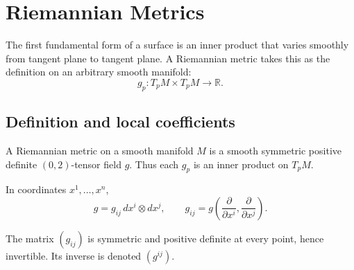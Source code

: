 \chapter{Riemannian Metrics}
\label{ch:vii20-riemannian-metrics}

The first fundamental form of a surface is an inner product that varies smoothly
from tangent plane to tangent plane.  A Riemannian metric takes this as the
definition on an arbitrary smooth manifold:
\[
\boxed{g_p:T_pM\times T_pM\to\mathbb R.}
\]

\section{Definition and local coefficients}

\begin{definition}\label{def:vii20-metric}
A Riemannian metric on a smooth manifold \(M\) is a smooth symmetric positive
definite \((0,2)\)-tensor field \(g\). Thus each \(g_p\) is an inner product on
\(T_pM\).
\end{definition}

In coordinates \(x^1,\dots,x^n\),
\[
g=g_{ij}\,dx^i\otimes dx^j,
\qquad
g_{ij}=g\!\left(\frac{\partial}{\partial x^i},
\frac{\partial}{\partial x^j}\right).
\]

\begin{proposition}\label{prop:vii20-positive}
The matrix \((g_{ij})\) is symmetric and positive definite at every point, hence
invertible.  Its inverse is denoted \((g^{ij})\).
\end{proposition}


